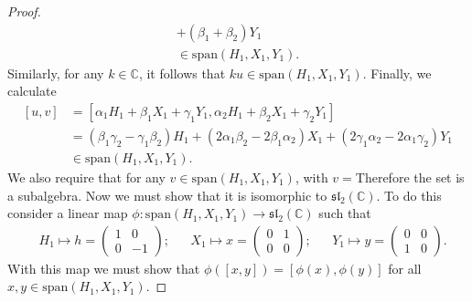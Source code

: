 \documentclass[12pt]{article}
\theoremstyle{definition}
\begin{document}
\begin{enumerate}
\begin{enumerate}[label=(\alph*)]
\begin{proof}
\begin{equation*}
\begin{split}
                                +(\beta_1+\beta_2)Y_1\\
                                \in\text{span}(H_1, X_1, Y_1).
                            \end{split}
                        \end{equation*}
                        Similarly, for any $k\in \mathbb{C}$, it follows that
                        $ku\in\text{span}(H_1, X_1, Y_1)$. Finally, we
                        calculate
                        \begin{equation*}
                            \begin{split}
                                [u, v] &= [\alpha_1 H_1+\beta_1 X_1+\gamma_1
                                Y_1, \alpha_2 H_1+\beta_2 X_1+\gamma_2 Y_1] \\
                                &=(\beta_1\gamma_2-\gamma_1\beta_2)H_1+
                                (2\alpha_1\beta_2-2\beta_1\alpha_2)X_1+
                                (2\gamma_1\alpha_2-2\alpha_1\gamma_2)Y_1 \\
                                &\in\text{span}(H_1, X_1, Y_1).
                            \end{split}
                        \end{equation*}
                        We also require that for any $v\in\text{span}(H_1, X_1,
                        Y_1)$, with $v=$Therefore the set is a subalgebra. Now we must show
                        that it is isomorphic to $\mathfrak{sl}_2(\mathbb{C})$.
                        To do this consider a linear map $\phi:\text{span}(H_1, X_1,
                        Y_1)\to\mathfrak{sl}_2(\mathbb{C})$ such that 
                        \begin{align*}
                            &H_1\mapsto h=\begin{pmatrix}1&0\\0&-1\end{pmatrix};&
                            &X_1\mapsto x=\begin{pmatrix}0&1\\0&0\end{pmatrix} ;&
                            &Y_1\mapsto y=\begin{pmatrix}0&0\\1&0\end{pmatrix} .
                        \end{align*}
                        With this map we must show that $\phi([x, y])=[\phi(x),
                        \phi(y)]$ for all $x, y\in\text{span}(H_1, X_1, Y_1)$.

\end{proof}
\end{enumerate}
\end{enumerate}
\end{document}

